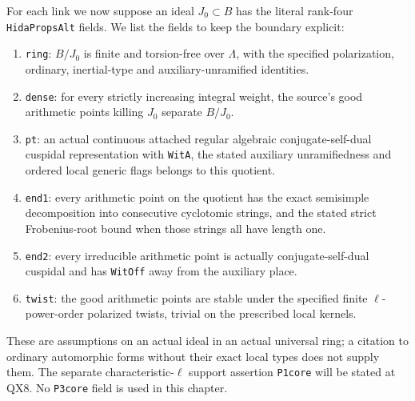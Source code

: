 For each link we now suppose an ideal $J_0\subset B$ has the
literal rank-four \texttt{HidaPropsAlt} fields.  We list the
fields to keep the boundary explicit:
\begin{enumerate}
\item \texttt{ring}: $B/J_0$ is finite and torsion-free over
$\Lambda$, with the specified polarization, ordinary,
inertial-type and auxiliary-unramified identities.
\item \texttt{dense}: for every strictly increasing integral
weight, the source's good arithmetic points killing $J_0$
separate $B/J_0$.
\item \texttt{pt}: an actual continuous attached regular
algebraic conjugate-self-dual cuspidal representation with
\texttt{WitA}, the stated auxiliary unramifiedness and
ordered local generic flags belongs to this quotient.
\item \texttt{end1}: every arithmetic point on the quotient
has the exact semisimple decomposition into consecutive
cyclotomic strings, and the stated strict Frobenius-root
bound when those strings all have length one.
\item \texttt{end2}: every irreducible arithmetic point is
actually conjugate-self-dual cuspidal and has
\texttt{WitOff} away from the auxiliary place.
\item \texttt{twist}: the good arithmetic points are stable
under the specified finite $\ell$-power-order polarized
twists, trivial on the prescribed local kernels.
\end{enumerate}
These are assumptions on an actual ideal in an actual
universal ring; a citation to ordinary automorphic forms
without their exact local types does not supply them.
The separate characteristic-$\ell$ support assertion
\texttt{P1core} will be stated at QX8.  No \texttt{P3core}
field is used in this chapter.

